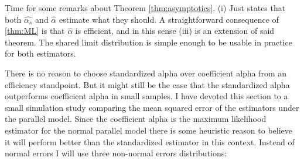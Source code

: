 \documentclass{article}
\theoremstyle{plain}
\theoremstyle{plain}
\theoremstyle{definition}
\theoremstyle{remark}
\theoremstyle{definition}
\theoremstyle{plain}
\theoremstyle{plain}
\theoremstyle{definition}
\begin{document}
Time for some remarks about Theorem \ref{thm:asymptotics}. (i) Just states that both $\widehat{\alpha_s}$ and $\widehat{\alpha}$ estimate what they should. A straightforward consequence of \ref{thm:ML} is that $\widehat{\alpha}$ is efficient, and in this sense (iii) is an extension of said theorem. The shared limit distribution is simple enough to be usable in practice for both estimators. 

There is no reason to choose standardized alpha over coefficient alpha from an efficiency standpoint. But it might still be the case
that the standardized alpha outperforms coefficient alpha
in small samples. I have devoted this section to a small simulation
study comparing the mean squared error of the estimators under
the parallel model. Since the coefficient alpha is the maximum likelihood
estimator for the normal parallel model there is some heuristic reason
to believe it will perform better than the standardized estimator
in this context. Instead of normal errors I will use three non-normal
errors distributions:
\end{document}
